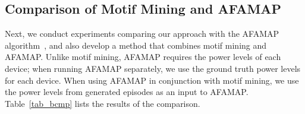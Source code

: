 
\subsection{Comparison of Motif Mining and AFAMAP}
Next, we conduct experiments comparing our approach with
the AFAMAP algorithm~\cite{kolter2012aistat}, and also
develop a method that combines motif mining and AFAMAP.
Unlike motif mining, AFAMAP requires the power levels of each device;
when running AFAMAP separately, we use the ground truth power levels
for each device. When using AFAMAP in conjunction with motif mining,
we use the power levels from generated episodes as an input to AFAMAP.
Table~\ref{tab_bcmp} lists the results of the comparison.


